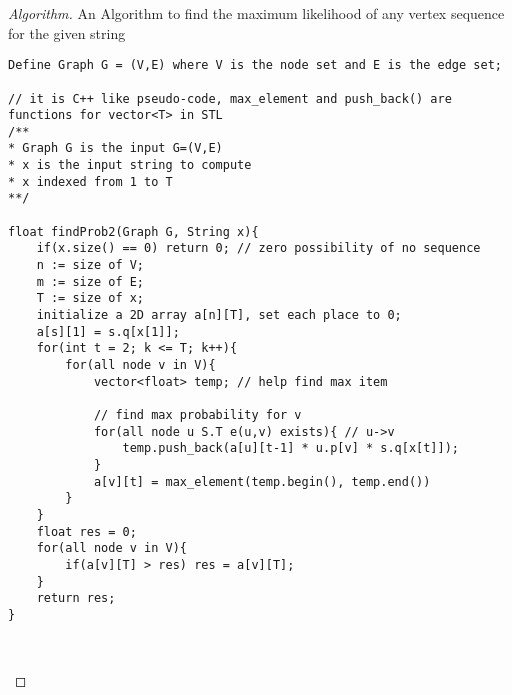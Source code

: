 \documentclass[openany]{article}
\begin{document}
\begin{proof}[Algorithm]{}
		\renewcommand{\qedsymbol}{}
		An Algorithm to find the maximum likelihood of any vertex sequence for the given string
		\begin{lstlisting}[basicstyle=\fontsize{8}{9}\selectfont\ttfamily]
Define Graph G = (V,E) where V is the node set and E is the edge set;

// it is C++ like pseudo-code, max_element and push_back() are functions for vector<T> in STL
/**
* Graph G is the input G=(V,E)
* x is the input string to compute
* x indexed from 1 to T
**/

float findProb2(Graph G, String x){
    if(x.size() == 0) return 0; // zero possibility of no sequence
    n := size of V;
    m := size of E;
    T := size of x;
    initialize a 2D array a[n][T], set each place to 0;
    a[s][1] = s.q[x[1]];
    for(int t = 2; k <= T; k++){
        for(all node v in V){
            vector<float> temp; // help find max item
            
            // find max probability for v
            for(all node u S.T e(u,v) exists){ // u->v
                temp.push_back(a[u][t-1] * u.p[v] * s.q[x[t]]);
            }
            a[v][t] = max_element(temp.begin(), temp.end())
        }
    }
    float res = 0;
    for(all node v in V){
        if(a[v][T] > res) res = a[v][T];
    }
    return res;
}

        
		\end{lstlisting} 
\end{proof}
\end{document}
